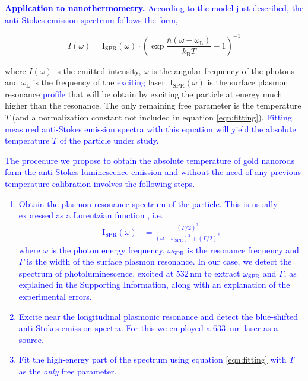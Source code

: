\documentclass[journal=nalefd,manuscript=letter]{achemso}
\newcommand{\HI}[1]{\textcolor{blue}{#1}} %
\newcommand{\nm}{\ensuremath{\,\textrm{nm}}}
\begin{document}
\HI{\textbf{Application to nanothermometry.} According to the model just
described, the anti-Stokes emission spectrum follows the form,}

\begin{equation}\label{eqn:fitting}
	I(\omega) =
	\textrm{I}_{\textrm{SPR}}(\omega)\cdot\left(\exp\frac{\hbar(\omega-\omega_\textrm{L})}{k_\textrm{B}T}-1\right)^{-1}
\end{equation}

\noindent where $I(\omega) $ is the emitted intensity, $\omega$ is the angular frequency
of the photons and $\omega_\textrm{L}$ is the frequency of the \HI{exciting} laser.
$\textrm{I}_{\textrm{SPR}}(\omega) $ is the surface plasmon resonance \HI{profile} that 
will be obtain by exciting the particle at energy much higher than the resonance. The
only remaining free parameter is the temperature $T$ (and a normalization
constant not included in equation \ref{eqn:fitting}). \HI{Fitting  
measured anti-Stokes emission spectra with this equation will 
yield the absolute temperature $T$ of the particle under study.}

\HI{The procedure we propose to obtain the absolute temperature of gold nanorods 
form the anti-Stokes luminescence emission and without 
the need of any previous temperature calibration involves the following steps.}

\HI{
\begin{enumerate}
	\item Obtain the plasmon resonance spectrum of the particle. This is usually expressed as a 
	Lorentzian function \cite{Zijlstra2011}, i.e.
	\begin{align*}
	\textrm{I}_{\textrm{SPR}}(\omega) &= \frac{\left( \Gamma/2 \right)^2}{\left( \omega-\omega_\textrm{SPR}\right)^2 +
	\left( \Gamma/2 \right)^2} 
	\end{align*}
	where $\omega$ is the photon energy frequency, $\omega_\textrm{SPR}$ is the resonance frequency 
	and $\Gamma$ is the width of the surface plasmon resonance.
	In our case, we detect the spectrum of photoluminescence,	excited at $532\nm$ to extract 
	$\omega_\textrm{SPR}$ and $\Gamma$, as explained in the Supporting Information, along with an explanation of the 
	experimental errors. 
	\item Excite near the longitudinal plasmonic resonance and detect the blue-shifted anti-Stokes emission spectra. For this we employed a $633\,$ nm  laser as a source. 
	\item Fit the high-energy part of the spectrum using equation \ref{eqn:fitting} with $T$ as the \textit{only} free parameter.
\end{enumerate}
}
\end{document}
